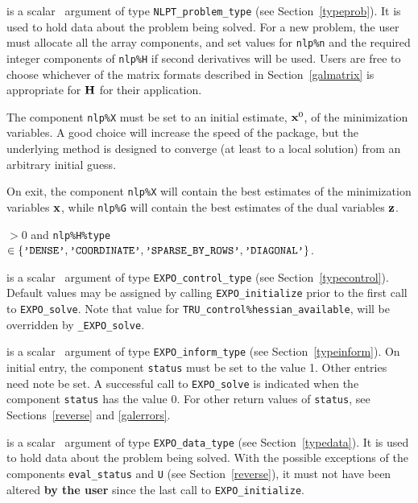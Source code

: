 \documentclass{galahad}
\newcommand{\packagename}{EXPO}
\newcommand{\fullpackagename}{\libraryname\_\packagename}
\newcommand{\solver}{{\tt \fullpackagename\_solve}}
\begin{document}
\vspace*{-2mm}
\begin{description}
 is a scalar \intentinout\ argument of type
{\tt NLPT\_problem\_type}
(see Section~\ref{typeprob}).
It is used to hold data about the problem being solved.
For a new problem, the user must allocate all the array components,
and set values for {\tt nlp\%n}
and the required integer components of {\tt nlp\%H} if second derivatives
will be used.
Users are free to choose whichever
of the matrix formats described in Section~\ref{galmatrix}
is appropriate for ${\mathbf{H}}$ for their application.

\noindent
The component {\tt nlp\%X} must be set to an initial estimate, ${\mathbf{x}}^{0}$,
of the minimization variables. A good choice will increase the speed
of the package, but the underlying method is designed to converge (at least
to a local solution) from an arbitrary initial guess.

\noindent
On exit, the component {\tt nlp\%X} will contain the best estimates of the
minimization variables ${\mathbf{x}}$, while {\tt nlp\%G} will contain the best 
estimates of the dual variables ${\mathbf{z}}$.

\noindent
{} $> 0$ and
{\tt nlp\%H\%type} $\in \{
  \mbox{\tt 'DENSE'}, \mbox{\tt 'COORDINATE'}, \mbox{\tt 'SPARSE\_BY\_ROWS'},
  \mbox{\tt 'DIAGONAL'} \}$.

 is a scalar \intentin\ argument of type
{\tt \packagename\_control\_type}
(see Section~\ref{typecontrol}). Default values may be assigned by calling
{\tt \packagename\_initialize} prior to the first call to
{\tt \packagename\_solve}. 
Note that value for {\tt TRU\_control\%\-hessian\_available},
will be overridden by \solver.

 is a scalar \intentinout\ argument of type
{\tt \packagename\_inform\_type}
(see Section~\ref{typeinform}).
On initial entry, the  component {\tt status} must be set to the value 1.
Other entries need note be set.
A successful call to
{\tt \packagename\_solve}
is indicated when the  component {\tt status} has the value 0.
For other return values of {\tt status}, see Sections~\ref{reverse} and
\ref{galerrors}.

 is a scalar \intentinout\ argument of type
{\tt \packagename\_data\_type}
(see Section~\ref{typedata}). It is used to hold data about the problem being
solved. With the possible exceptions of the components
{\tt eval\_status} and {\tt U} (see Section~\ref{reverse}),
it must not have been altered {\bf by the user} since the last call to
{\tt \packagename\_initialize}.


\end{description}
\end{document}
